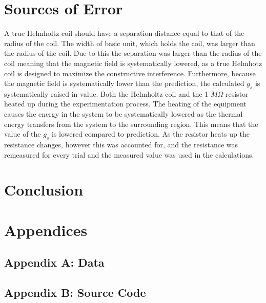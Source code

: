 \documentclass[a4paper]{article}
\begin{document}
\section{Sources of Error}
\qq A true Helmholtz coil should have a separation distance equal to
that of the radius of the coil. The width of basic unit, which holds
the coil, was larger than the radius of the coil. Due to this the
separation was larger than the radius of the coil meaning that the
magnetic field is systematically lowered, as a true Helmhotz coil is
designed to maximize the constructive interference.  Furthermore,
because the magnetic field is systematically lower than the
prediction, the calculated $g_s$ is systematically raised in
value. Both the Helmholtz coil and the 1 $M \Omega$ resistor heated up
during the experimentation process. The heating of the equipment
causes the energy in the system to be systematically lowered as the
thermal energy transfers from the system to the surrounding region. This means
that the value of the $g_s$ is lowered compared to prediction. As the
resistor heats up the resistance changes, however this was accounted
for, and the resistance was remeasured for every trial and the
measured value was used in the calculations.

\section{Conclusion}
\qq

\section{Appendices}

\subsection{Appendix A: Data}

\subsection{Appendix B: Source Code}
\end{document}
